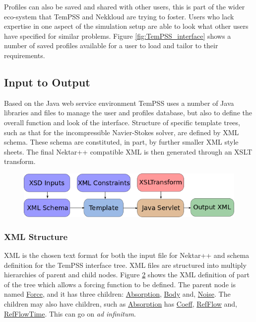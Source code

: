 \documentclass[11pt, a4paper]{report}
\begin{document}
Profiles can also be saved and shared with other users, this is part of the wider eco-system that TemPSS and Nekkloud are trying to foster. Users who lack expertise in one aspect of the simulation setup are able to look what other users have specified for similar problems. Figure \ref{fig:TemPSS_interface} shows a number of saved profiles available for a user to load and tailor to their requirements.

\subsection{Input to Output}
Based on the Java web service environment TemPSS uses a number of Java libraries and files to manage the user and profiles database, but also to define the overall function and look of the interface. Structure of specific template trees, such as that for the incompressible Navier-Stokes solver, are defined by XML schema. These schema are constituted, in part, by further smaller XML style sheets. The final Nektar++ compatible XML is then generated through an XSLT transform.

\begin{figure}[htb!]
 \centering
 \includegraphics[width=.75\linewidth,  clip=true, trim = 0cm 0cm 0cm 0cm]{TEMPSS}
 \label{fig:TEMPSS}
\end{figure}

\subsubsection{XML Structure}
XML is the chosen text format for both the input file for Nektar++ and schema definition for the TemPSS interface tree. XML files are structured into multiply hierarchies of parent and child nodes. Figure \ref{fig:XML} shows the XML definition of part of the tree which allows a forcing function to be defined. The parent node is named \url{Force}, and it has three children: \url{Absorption}, \url{Body} and, \url{Noise}. The children may also have children, such as \url{Absorption} has \url{Coeff}, \url{RefFlow} and, \url{RefFlowTime}. This can go on \textit{ad infinitum}.

\begin{figure}[htb!]
 \centering
 
 \label{fig:XML}
\end{figure}
\end{document}
